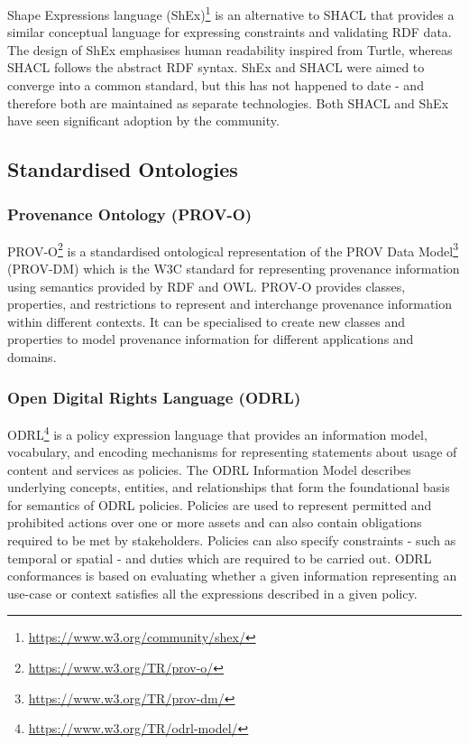 Shape Expressions language (ShEx)\footnote{\url{https://www.w3.org/community/shex/}} is an alternative to SHACL that provides a similar conceptual language for expressing constraints and validating RDF data. The design of ShEx emphasises human readability inspired from Turtle, whereas SHACL follows the abstract RDF syntax. ShEx and SHACL were aimed to converge into a common standard, but this has not happened to date - and therefore both are maintained as separate technologies. Both SHACL and ShEx have seen significant adoption by the community.


\subsection{Standardised Ontologies}
\subsubsection{Provenance Ontology (PROV-O)}
PROV-O\footnote{\url{https://www.w3.org/TR/prov-o/}} is a standardised ontological representation of the PROV Data Model\footnote{\url{https://www.w3.org/TR/prov-dm/}} (PROV-DM) which is the W3C standard for representing provenance information using semantics provided by RDF and OWL.
PROV-O provides classes, properties, and restrictions to represent and interchange provenance information within different contexts.
It can be specialised to create new classes and properties to model provenance information for different applications and domains.

\subsubsection{Open Digital Rights Language (ODRL)}
ODRL\footnote{\url{https://www.w3.org/TR/odrl-model/}} is a policy expression language that provides an information model, vocabulary, and encoding mechanisms for representing statements about usage of content and services as policies. The ODRL Information Model describes underlying concepts, entities, and relationships that form the foundational basis for semantics of ODRL policies.
Policies are used to represent permitted and prohibited actions over one or more assets and can also contain obligations required to be met by stakeholders.
Policies can also specify constraints - such as temporal or spatial - and duties which are required to be carried out.
ODRL conformances is based on evaluating whether a given information representing an use-case or context satisfies all the expressions described in a given policy.